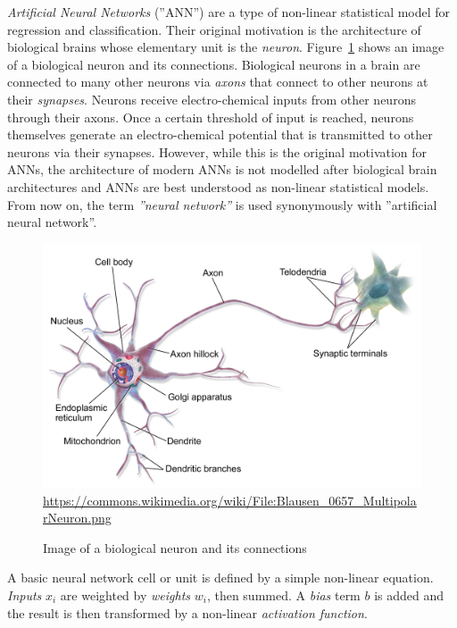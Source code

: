 \emph{Artificial Neural Networks} (''ANN'') are a type of non-linear statistical model for regression and classification. Their original motivation is the architecture of biological brains whose elementary unit is the \emph{neuron}. Figure~\ref{fig:neuron} shows an image of a biological neuron and its connections. Biological neurons in a brain are connected to many other neurons via \emph{axons} that connect to other neurons at their \emph{synapses}. Neurons receive electro-chemical inputs from other neurons through their axons. Once a certain threshold of input is reached, neurons themselves generate an electro-chemical potential that is transmitted to other neurons via their synapses. However, while this is the original motivation for ANNs, the architecture of modern ANNs is not modelled after biological brain architectures and ANNs are best understood as non-linear statistical models. From now on, the term \emph{''neural network''} is used synonymously with ''artificial neural network''.

\begin{figure}
\centering
\includegraphics[width=.7\textwidth]{Blausen_0657_MultipolarNeuron.png}
\scriptsize \url{https://commons.wikimedia.org/wiki/File:Blausen_0657_MultipolarNeuron.png}
\caption{Image of a biological neuron and its connections}
\label{fig:neuron}
\end{figure}

A basic neural network cell or unit is defined by a simple non-linear equation. \emph{Inputs} $x_i$ are weighted by \emph{weights} $w_i$, then summed. A \emph{bias} term $b$ is added and the result is then transformed by a non-linear \emph{activation function}.

